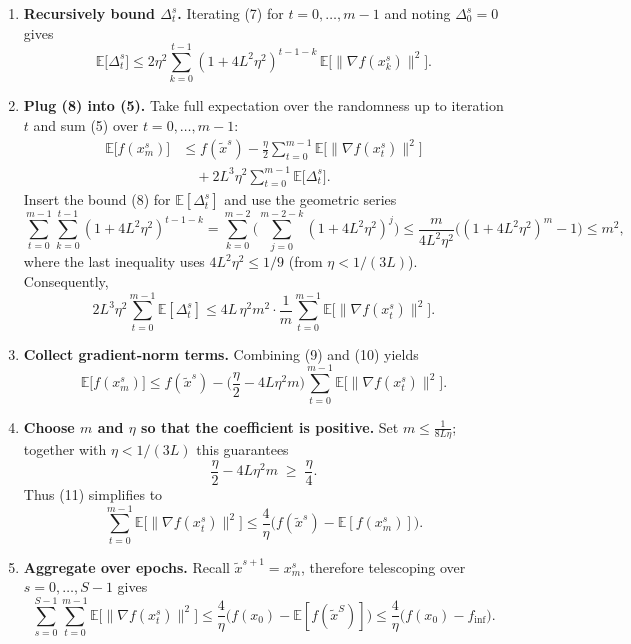 \documentclass{article}
\begin{document}
\begin{enumerate}[label=[Step \arabic*], leftmargin=*]
\item \textbf{Recursively bound $\Delta_{t}^{s}$.}  
Iterating (7) for $t=0,\dots,m-1$ and noting $\Delta_{0}^{s}=0$ gives
\[
\mathbb{E}\!\big[\Delta_{t}^{s}\big]\le
2\eta^{2}\sum_{k=0}^{t-1}(1+4L^{2}\eta^{2})^{t-1-k}\,
\mathbb{E}\!\big[\|\nabla f(x_{k}^{s})\|^{2}\big].
\tag{8}
\]

\item \textbf{Plug (8) into (5).}  
Take full expectation over the randomness up to iteration $t$ and sum (5) over $t=0,\dots,m-1$:
\[
\begin{aligned}
\mathbb{E}\big[f(x_{m}^{s})\big]
&\le f(\tilde{x}^{s})-\frac{\eta}{2}\sum_{t=0}^{m-1}\mathbb{E}\!\big[\|\nabla f(x_{t}^{s})\|^{2}\big] \\
&\quad +2L^{3}\eta^{2}\sum_{t=0}^{m-1}\mathbb{E}\!\big[\Delta_{t}^{s}\big].
\end{aligned}
\tag{9}
\]
Insert the bound (8) for $\mathbb{E}[\Delta_{t}^{s}]$ and use the geometric series
\[
\sum_{t=0}^{m-1}\sum_{k=0}^{t-1}(1+4L^{2}\eta^{2})^{t-1-k}
= \sum_{k=0}^{m-2}\bigg(\sum_{j=0}^{m-2-k}(1+4L^{2}\eta^{2})^{j}\bigg)
\le \frac{m}{4L^{2}\eta^{2}} \big((1+4L^{2}\eta^{2})^{m}-1\big)
\le m^{2},
\]
where the last inequality uses $4L^{2}\eta^{2}\le 1/9$ (from $\eta<1/(3L)$). Consequently,
\[
2L^{3}\eta^{2}\sum_{t=0}^{m-1}\mathbb{E}[\Delta_{t}^{s}]
\le 4L\,\eta^{2} m^{2}\cdot\frac{1}{m}\sum_{t=0}^{m-1}\mathbb{E}\!\big[\|\nabla f(x_{t}^{s})\|^{2}\big].
\tag{10}
\]

\item \textbf{Collect gradient‑norm terms.}  
Combining (9) and (10) yields
\[
\mathbb{E}\big[f(x_{m}^{s})\big]
\le f(\tilde{x}^{s})-\Big(\frac{\eta}{2}-4L\eta^{2}m\Big)\sum_{t=0}^{m-1}\mathbb{E}\!\big[\|\nabla f(x_{t}^{s})\|^{2}\big].
\tag{11}
\]

\item \textbf{Choose $m$ and $\eta$ so that the coefficient is positive.}  
Set $m\le \frac{1}{8L\eta}$; together with $\eta<1/(3L)$ this guarantees
\[
\frac{\eta}{2}-4L\eta^{2}m \;\ge\; \frac{\eta}{4}.
\tag{12}
\]
Thus (11) simplifies to
\[
\sum_{t=0}^{m-1}\mathbb{E}\!\big[\|\nabla f(x_{t}^{s})\|^{2}\big]
\le \frac{4}{\eta}\big(f(\tilde{x}^{s})- \mathbb{E}[f(x_{m}^{s})]\big).
\tag{13}
\]

\item \textbf{Aggregate over epochs.}  
Recall $\tilde{x}^{s+1}=x_{m}^{s}$, therefore telescoping over $s=0,\dots,S-1$ gives
\[
\sum_{s=0}^{S-1}\sum_{t=0}^{m-1}\mathbb{E}\!\big[\|\nabla f(x_{t}^{s})\|^{2}\big]
\le \frac{4}{\eta}\big(f(x_{0})- \mathbb{E}[f(\tilde{x}^{S})]\big)
\le \frac{4}{\eta}\big(f(x_{0})-f_{\inf}\big).
\tag{14}
\]


\end{enumerate}
\end{document}

